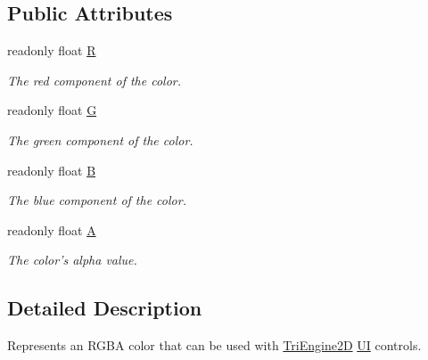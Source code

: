 \subsection*{Public Attributes}
\begin{DoxyCompactItemize}
\item 
readonly float \hyperlink{struct_tri_devs_1_1_tri_engine2_d_1_1_u_i_1_1_color_aa7c3ba09deebad2300f0d29b8e8c281d}{R}
\begin{DoxyCompactList}\small\item\em The red component of the color. \end{DoxyCompactList}\item 
readonly float \hyperlink{struct_tri_devs_1_1_tri_engine2_d_1_1_u_i_1_1_color_a62e164ea8c88b08b85de9bd80e9e33f1}{G}
\begin{DoxyCompactList}\small\item\em The green component of the color. \end{DoxyCompactList}\item 
readonly float \hyperlink{struct_tri_devs_1_1_tri_engine2_d_1_1_u_i_1_1_color_a0e823c9bd069dcc490d7eac642236eec}{B}
\begin{DoxyCompactList}\small\item\em The blue component of the color. \end{DoxyCompactList}\item 
readonly float \hyperlink{struct_tri_devs_1_1_tri_engine2_d_1_1_u_i_1_1_color_a60e21c806260d757c76bde99a54fa937}{A}
\begin{DoxyCompactList}\small\item\em The color's alpha value. \end{DoxyCompactList}\end{DoxyCompactItemize}


\subsection{Detailed Description}
Represents an R\-G\-B\-A color that can be used with \hyperlink{namespace_tri_devs_1_1_tri_engine2_d}{Tri\-Engine2\-D} \hyperlink{namespace_tri_devs_1_1_tri_engine2_d_1_1_u_i}{U\-I} controls. 



